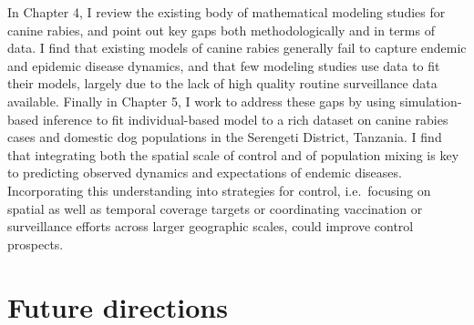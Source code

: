 \documentclass[
  oneside]{book}
\begin{document}
In Chapter 4, I review the existing body of mathematical modeling studies for canine rabies, and point out key gaps both methodologically and in terms of data. I find that existing models of canine rabies generally fail to capture endemic and epidemic disease dynamics, and that few modeling studies use data to fit their models, largely due to the lack of high quality routine surveillance data available. Finally in Chapter 5, I work to address these gaps by using simulation-based inference to fit individual-based model to a rich dataset on canine rabies cases and domestic dog populations in the Serengeti District, Tanzania. I find that integrating both the spatial scale of control and of population mixing is key to predicting observed dynamics and expectations of endemic diseases. Incorporating this understanding into strategies for control, i.e.~focusing on spatial as well as temporal coverage targets or coordinating vaccination or surveillance efforts across larger geographic scales, could improve control prospects.

\hypertarget{future-directions}{%
\section{Future directions}\label{future-directions}}
\end{document}
